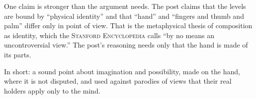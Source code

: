 \begin{afterword}
One claim is stronger than the argument needs. The post claims that the levels are bound by ``physical identity'' and that ``hand'' and ``fingers and thumb and palm'' differ only in point of view. That is the metaphysical thesis of composition as identity, which the \textsc{Stanford Encyclopedia} calls ``by no means an uncontroversial view.'' The post's reasoning needs only that the hand is made of its parts.

In short: a sound point about imagination and possibility, made on the hand, where it is not disputed, and used against parodies of views that their real holders apply only to the mind.
\end{afterword}
